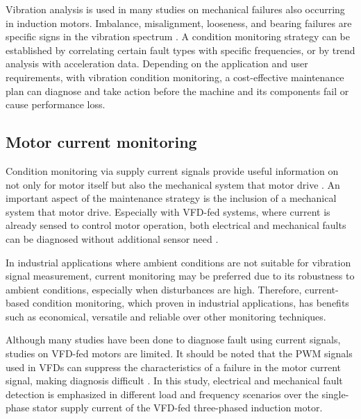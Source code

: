 Vibration analysis is used in many studies on mechanical failures also occurring in induction motors. Imbalance, misalignment, looseness, and bearing failures are specific signs in the vibration spectrum \cite{thorsen1998methods}. A condition monitoring strategy can be established by correlating certain fault types with specific frequencies, or by trend analysis with acceleration data. Depending on the application and user requirements, with vibration condition monitoring, a cost-effective maintenance plan can diagnose and take action before the machine and its components fail or cause performance loss.

\subsection{Motor current monitoring}

Condition monitoring via supply current signals provide useful information on not only for motor itself but also the mechanical system that motor drive \cite{thomson2001current}. An important aspect of the maintenance strategy is the inclusion of a mechanical system that motor drive. Especially with VFD-fed systems, where current is already sensed to control motor operation, both electrical and mechanical faults can be diagnosed without additional sensor need \cite{thomson2001current,gritli2017condition,corne2017misalignment,en201320958}. 

In industrial applications where ambient conditions are not suitable for vibration signal measurement, current monitoring may be preferred due to its robustness to ambient conditions, especially when disturbances are high.
Therefore, current-based condition monitoring, which proven in industrial applications, has benefits such as economical, versatile and reliable over other monitoring techniques.

Although many studies have been done to diagnose fault using current signals, studies on VFD-fed motors are limited. It should be noted that the PWM signals used in VFDs can suppress the characteristics of a failure in the motor current signal, making diagnosis difficult \cite{shaeboub2018monitoring}. In this study, electrical and mechanical fault detection is emphasized in different load and frequency scenarios over the single-phase stator supply current of the VFD-fed three-phased induction motor.


